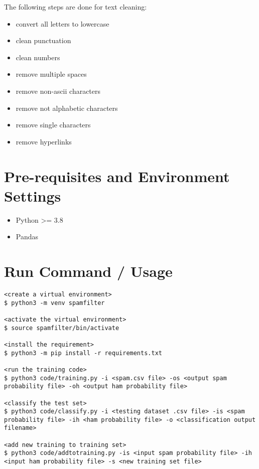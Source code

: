 \documentclass[twoside,10pt]{article}
\begin{document}
The following steps are done for text cleaning:

\begin{itemize}
    \itemsep1pt\parskip0pt
    \item convert all letters to lowercase
    \item clean punctuation
    \item clean numbers
    \item remove multiple spaces
    \item remove non-ascii characters
    \item remove not alphabetic characters
    \item remove single characters
    \item remove hyperlinks
\end{itemize}

\section*{Pre-requisites and Environment
  Settings}\label{pre-requisites-and-environment-settings}

\begin{itemize}
    \itemsep1pt\parskip0pt
    \item Python \textgreater{}= 3.8
    \item Pandas
\end{itemize}

\newpage

\section*{Run Command / Usage}\label{run-command-usage}

\begin{lstlisting}[breaklines]
<create a virtual environment>
$ python3 -m venv spamfilter

<activate the virtual environment>
$ source spamfilter/bin/activate

<install the requirement>
$ python3 -m pip install -r requirements.txt

<run the training code>
$ python3 code/training.py -i <spam.csv file> -os <output spam probability file> -oh <output ham probability file>

<classify the test set>
$ python3 code/classify.py -i <testing dataset .csv file> -is <spam probability file> -ih <ham probability file> -o <classification output filename>
        
<add new training to training set>
$ python3 code/addtotraining.py -is <input spam probability file> -ih <input ham probability file> -s <new training set file>
\end{lstlisting}
\end{document}
